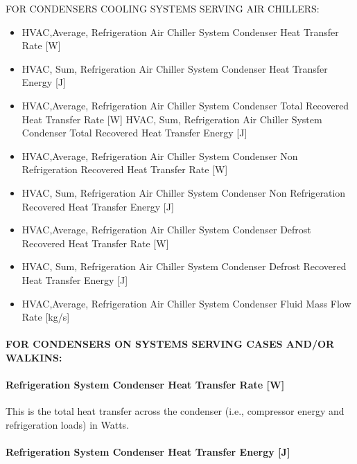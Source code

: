 FOR CONDENSERS COOLING SYSTEMS SERVING AIR CHILLERS:

\begin{itemize}
\item
  HVAC,Average, Refrigeration Air Chiller System Condenser Heat Transfer Rate {[}W{]}
\item
  HVAC, Sum, Refrigeration Air Chiller System Condenser Heat Transfer Energy {[}J{]}
\item
  HVAC,Average, Refrigeration Air Chiller System Condenser Total Recovered Heat Transfer Rate {[}W{]} HVAC, Sum, Refrigeration Air Chiller System Condenser Total Recovered Heat Transfer Energy {[}J{]}
\item
  HVAC,Average, Refrigeration Air Chiller System Condenser Non Refrigeration Recovered Heat Transfer Rate {[}W{]}
\item
  HVAC, Sum, Refrigeration Air Chiller System Condenser Non Refrigeration Recovered Heat Transfer Energy {[}J{]}
\item
  HVAC,Average, Refrigeration Air Chiller System Condenser Defrost Recovered Heat Transfer Rate {[}W{]}
\item
  HVAC, Sum, Refrigeration Air Chiller System Condenser Defrost Recovered Heat Transfer Energy {[}J{]}
\item
  HVAC,Average, Refrigeration Air Chiller System Condenser Fluid Mass Flow Rate {[}kg/s{]}
\end{itemize}

\paragraph{FOR CONDENSERS ON SYSTEMS SERVING CASES AND/OR WALKINS:}\label{for-condensers-on-systems-serving-cases-andor-walkins-2}

\paragraph{Refrigeration System Condenser Heat Transfer Rate {[}W{]}}\label{refrigeration-system-condenser-heat-transfer-rate-w-2}

This is the total heat transfer across the condenser (i.e., compressor energy and refrigeration loads) in Watts.

\paragraph{Refrigeration System Condenser Heat Transfer Energy {[}J{]}}\label{refrigeration-system-condenser-heat-transfer-energy-j-2}

